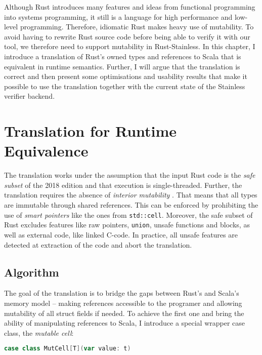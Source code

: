 Although Rust introduces many features and ideas from functional programming
into systems programming, it still is a language for high performance and
low-level programming. Therefore, idiomatic Rust makes heavy use of mutability.
To avoid having to rewrite Rust source code before being able to verify it with
our tool, we therefore need to support mutability in Rust-Stainless. In this
chapter, I introduce a translation of Rust's owned types and references to Scala
that is equivalent in runtime semantics. Further, I will argue that the
translation is correct and then present some optimisations and usability results
that make it possible to use the translation together with the current state of
the Stainless verifier backend.

\section{Translation for Runtime Equivalence}
\label{sec:translation}

The translation works under the assumption that the input Rust code is the
\emph{safe subset} \cite[section ``Unsafety'']{rustref} of the 2018 edition and
that execution is single-threaded. Further, the translation requires the absence
of \emph{interior mutability} \cite[section ``Interior Mutability'']{rustref}.
That means that all types are immutable through shared references. This can be
enforced by prohibiting the use of \emph{smart pointers} like the ones from
\passthrough{\lstinline!std::cell!}. Moreover, the safe subset of Rust excludes
features like raw pointers, \passthrough{\lstinline!union!}, unsafe functions
and blocks, as well as external code, like linked C-code. In practice, all
unsafe features are detected at extraction of the code and abort the
translation.


\subsection{Algorithm}

The goal of the translation is to bridge the gaps between Rust's and Scala's
memory model -- making references accessible to the programer and allowing
mutability of all struct fields if needed. To achieve the first one and bring
the ability of manipulating references to Scala, I introduce a special wrapper
case class, the \emph{mutable cell}:

\begin{lstlisting}[language=Scala, style=short]
case class MutCell[T](var value: t)
\end{lstlisting}

